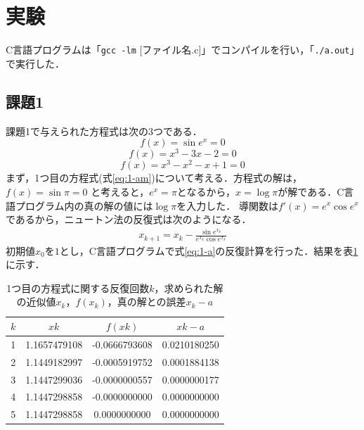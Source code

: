 \documentclass[12pt]{jarticle}
\renewcommand  \[  {\begin{eqnarray}}
\renewcommand  \]  {\end{eqnarray}}
\begin{document}
\section{実験}
\label{sec:exp}
C言語プログラムは「\verb|gcc -lm| [ファイル名.c]」でコンパイルを行い，「\verb|./a.out|」で実行した．
\subsection{課題1}
課題1で与えられた方程式は次の3つである．
\begin{equation}
f(x)=\sin e^x = 0
\label{eq:1-am}
\end{equation}
\begin{equation}
f(x)=x^3-3x-2 = 0
\label{eq:1-bm}
\end{equation}
\begin{equation}
f(x)=x^3-x^2-x+1 = 0
\label{eq:1-cm}
\end{equation}
まず，1つ目の方程式(式\ref{eq:1-am})について考える．方程式の解は，$f(x)=\sin\pi=0$
と考えると，$e^x=\pi$となるから，$x=\log\pi$が解である．C言語プログラム内の真の解の値には$\log\pi$を入力した．
導関数は$f\prime(x)=e^x\cos e^x$であるから，ニュートン法の反復式は次のようになる．
\[
\label{eq:1-a}
x_{k+1}=x_k- \frac{\sin e^{x_k}}{e^{x_k}\cos e^{x_k}}
\]
初期値$x_0$を$1$とし，C言語プログラムで式\ref{eq:1-a}の反復計算を行った．結果を表\ref{tab:1-a}に示す．
\begin{table}[t]
 \caption{1つ目の方程式に関する反復回数$k$，求められた解の近似値$x_k$，$f(x_k)$，真の解との誤差\textbar $x_k-a$\textbar}
 \label{tab:1-a}
 \center
\begin{tabular}{|c|c|c|c|}
\hline
 $k$ & $xk$ & $f(xk)$ & $xk-a$\\
\hline
1  & 1.1657479108 & -0.0666793608 & 0.0210180250\\
2  & 1.1449182997 & -0.0005919752 & 0.0001884138\\
3  & 1.1447299036 & -0.0000000557 & 0.0000000177\\
4  & 1.1447298858 & -0.0000000000 & 0.0000000000\\
5  & 1.1447298858 & 0.0000000000 & 0.0000000000\\
\hline
 \end{tabular}
\end{table}
\end{document}
